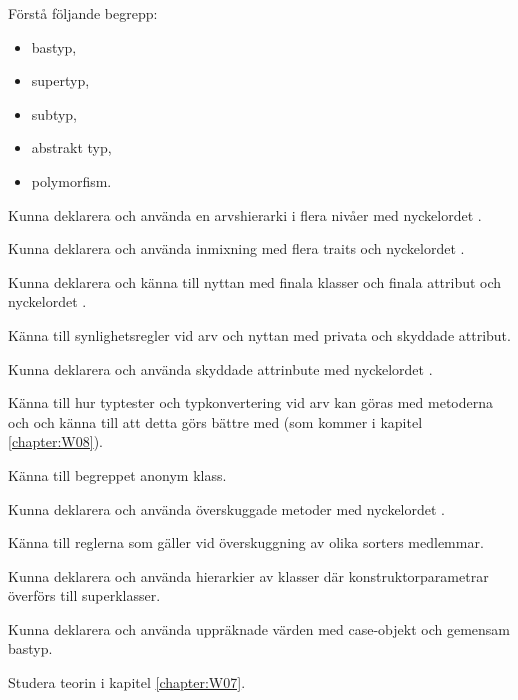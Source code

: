 

\Exercise{\ExeWeekSEVEN}

\begin{Goals}
\item Förstå följande begrepp: 
  \begin{itemize}[nosep, label={$\square$},] 
  \item bastyp,  \item supertyp, \item subtyp, \item abstrakt typ, \item polymorfism. 
  \end{itemize}
\item Kunna deklarera och använda en arvshierarki i flera nivåer med nyckelordet .
\item Kunna deklarera och använda inmixning med flera traits och nyckelordet .
\item Kunna deklarera och känna till nyttan med finala klasser och finala attribut och nyckelordet .  
\item Känna till synlighetsregler vid arv och nyttan med privata och skyddade attribut.
\item Kunna deklarera och använda skyddade attrinbute med nyckelordet .
\item Känna till hur typtester och typkonvertering vid arv kan göras med metoderna  och  och känna till att detta görs bättre med  (som kommer i kapitel \ref{chapter:W08}).
\item Känna till begreppet anonym klass.
\item Kunna deklarera och använda överskuggade metoder med nyckelordet .
\item Känna till reglerna som gäller vid överskuggning av olika sorters medlemmar.
\item Kunna deklarera och använda hierarkier av klasser där konstruktorparametrar överförs till superklasser. 
\item Kunna deklarera och använda uppräknade värden med case-objekt och gemensam bastyp.
\end{Goals}

\begin{Preparations}
\item Studera teorin i kapitel \ref{chapter:W07}.
\end{Preparations}

